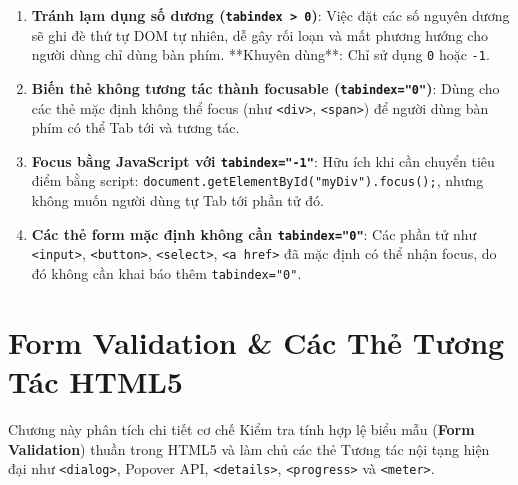 \documentclass[11pt,oneside]{book}
\newcommand{\codeinline}[1]{\textcolor{accentOrange}{\texttt{#1}}}
\newcommand{\term}[1]{\textbf{\textcolor{primaryBlue}{#1}}}
\begin{document}
\begin{warnBox}
\begin{enumerate}[leftmargin=1.5em, itemsep=4pt, parsep=0pt]
    \item \textbf{Tránh lạm dụng số dương (\codeinline{tabindex > 0})}: Việc đặt các số nguyên dương sẽ ghi đè thứ tự DOM tự nhiên, dễ gây rối loạn và mất phương hướng cho người dùng chỉ dùng bàn phím. **Khuyên dùng**: Chỉ sử dụng \codeinline{0} hoặc \codeinline{-1}.
    \item \textbf{Biến thẻ không tương tác thành focusable (\codeinline{tabindex="0"})}: Dùng cho các thẻ mặc định không thể focus (như \codeinline{<div>}, \codeinline{<span>}) để người dùng bàn phím có thể Tab tới và tương tác.
    \item \textbf{Focus bằng JavaScript với \codeinline{tabindex="-1"}}: Hữu ích khi cần chuyển tiêu điểm bằng script: \codeinline{document.getElementById("myDiv").focus();}, nhưng không muốn người dùng tự Tab tới phần tử đó.
    \item \textbf{Các thẻ form mặc định không cần \codeinline{tabindex="0"}}: Các phần tử như \codeinline{<input>}, \codeinline{<button>}, \codeinline{<select>}, \codeinline{<a href>} đã mặc định có thể nhận focus, do đó không cần khai báo thêm \codeinline{tabindex="0"}.
\end{enumerate}
\end{warnBox}





\chapter{Form Validation \& Các Thẻ Tương Tác HTML5}
\label{chap:forms_validation_interactive}

Chương này phân tích chi tiết cơ chế Kiểm tra tính hợp lệ biểu mẫu (\term{Form Validation}) thuần trong HTML5 và làm chủ các thẻ Tương tác nội tạng hiện đại như \codeinline{<dialog>}, Popover API, \codeinline{<details>}, \codeinline{<progress>} và \codeinline{<meter>}.

\end{document}
